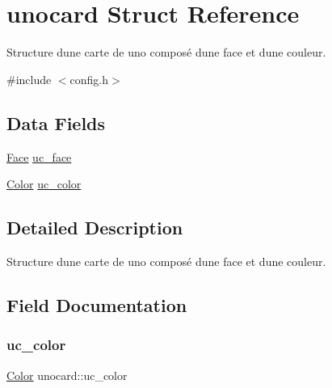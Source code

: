 \hypertarget{structunocard}{}\section{unocard Struct Reference}
\label{structunocard}


Structure d\textquotesingle{}une carte de uno composé d\textquotesingle{}une face et d\textquotesingle{}une couleur.  




{\ttfamily \#include $<$config.\+h$>$}

\subsection*{Data Fields}
\begin{DoxyCompactItemize}
\item 
\mbox{\hyperlink{config_8h_a80484981734e6c1484093a9f037e79c7}{Face}} \mbox{\hyperlink{structunocard_aa9c84cf6eec4f7a2018827449c0943da}{uc\+\_\+face}}
\item 
\mbox{\hyperlink{config_8h_af03b271da9a2fa2b56bab917f69c0808}{Color}} \mbox{\hyperlink{structunocard_a1310b23caad6c91818bd4cda96218e04}{uc\+\_\+color}}
\end{DoxyCompactItemize}


\subsection{Detailed Description}
Structure d\textquotesingle{}une carte de uno composé d\textquotesingle{}une face et d\textquotesingle{}une couleur. 



\subsection{Field Documentation}
\mbox{\label{structunocard_a1310b23caad6c91818bd4cda96218e04}} 
\subsubsection{\texorpdfstring{uc\_color}{uc\_color}}
{\footnotesize\ttfamily \mbox{\hyperlink{config_8h_af03b271da9a2fa2b56bab917f69c0808}{Color}} unocard\+::uc\+\_\+color}

\mbox{\label{structunocard_aa9c84cf6eec4f7a2018827449c0943da}} 
